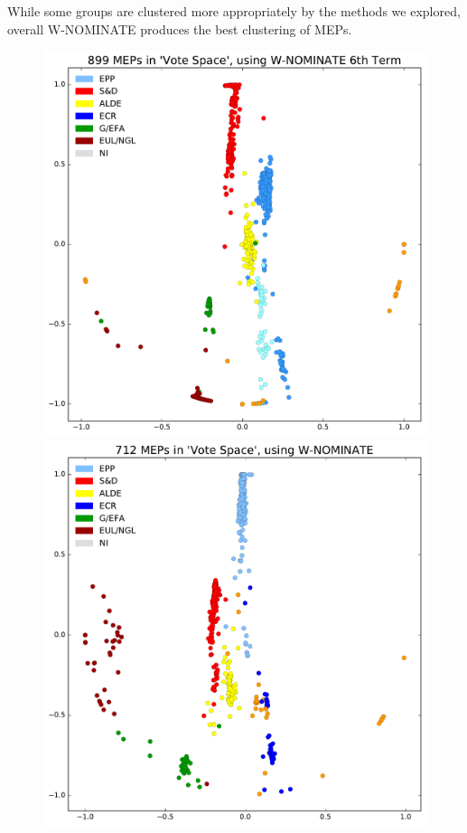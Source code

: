 \documentclass{llncs}
\begin{document}
While some groups are clustered more appropriately by the methods we explored, overall W-NOMINATE produces the best clustering of MEPs.

\begin{figure}[!h]
    \centering
    \begin{minipage}{0.5\textwidth}
        \centering
        \includegraphics[width=1.0\textwidth]{figures/W-NOMINATE-6th.pdf}
    \end{minipage}%
    \begin{minipage}{0.5\textwidth}
        \centering
        \includegraphics[width=1.0\textwidth]{figures/W-NOMINATE-7th.pdf}

\end{minipage}
\end{figure}
\end{document}
